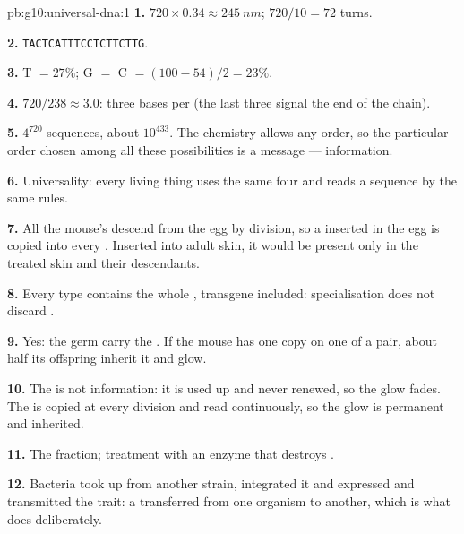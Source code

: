 \begin{solution}{pb:g10:universal-dna:1}
\textbf{1.} $720 \times 0.34 \approx \qty{245}{nm}$; $720/10 = 72$
turns.

\textbf{2.} \texttt{TACTCATTTCCTCTTCTTG}.

\textbf{3.} T $= 27\%$; G $=$ C $= (100 - 54)/2 = 23\%$.

\textbf{4.} $720/238 \approx 3.0$: three bases per  (the
last three signal the end of the chain).

\textbf{5.} $4^{720}$ sequences, about $10^{433}$. The chemistry allows
any order, so the particular order chosen among all these
possibilities is a message --- information.

\textbf{6.} Universality: every living thing uses the same four
 and reads a sequence by the same rules.

\textbf{7.} All the mouse's  descend from the egg by division, so
a  inserted in the egg is copied into every . Inserted into
adult skin, it would be present only in the treated skin  and
their descendants.

\textbf{8.} Every  type contains the whole , transgene
included: specialisation does not discard .

\textbf{9.} Yes: the germ  carry the . If the mouse has one
copy on one  of a pair, about half its offspring inherit it
and glow.

\textbf{10.} The  is not information: it is used up and never
renewed, so the glow fades. The  is copied at every division and
read continuously, so the glow is permanent and inherited.

\textbf{11.} The  fraction; treatment with an enzyme that destroys
.

\textbf{12.} Bacteria took up  from another strain, integrated it
and expressed and transmitted the trait: a  transferred from one
organism to another, which is what  does deliberately.


\end{solution}
